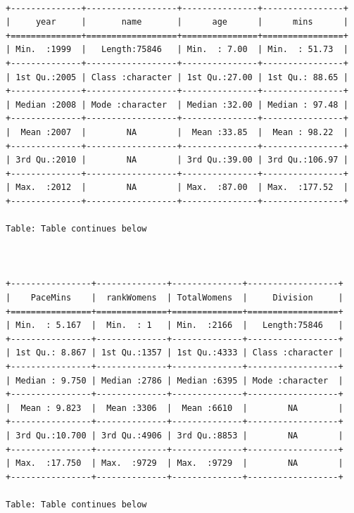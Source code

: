 \documentclass[
]{article}
\begin{document}
\begin{verbatim}

+--------------+------------------+---------------+----------------+
|     year     |       name       |      age      |      mins      |
+==============+==================+===============+================+
| Min.  :1999  |   Length:75846   | Min.  : 7.00  | Min.  : 51.73  |
+--------------+------------------+---------------+----------------+
| 1st Qu.:2005 | Class :character | 1st Qu.:27.00 | 1st Qu.: 88.65 |
+--------------+------------------+---------------+----------------+
| Median :2008 | Mode :character  | Median :32.00 | Median : 97.48 |
+--------------+------------------+---------------+----------------+
|  Mean :2007  |        NA        |  Mean :33.85  |  Mean : 98.22  |
+--------------+------------------+---------------+----------------+
| 3rd Qu.:2010 |        NA        | 3rd Qu.:39.00 | 3rd Qu.:106.97 |
+--------------+------------------+---------------+----------------+
| Max.  :2012  |        NA        | Max.  :87.00  | Max.  :177.52  |
+--------------+------------------+---------------+----------------+

Table: Table continues below

 

+----------------+--------------+--------------+------------------+
|    PaceMins    |  rankWomens  | TotalWomens  |     Division     |
+================+==============+==============+==================+
| Min.  : 5.167  |  Min.  : 1   | Min.  :2166  |   Length:75846   |
+----------------+--------------+--------------+------------------+
| 1st Qu.: 8.867 | 1st Qu.:1357 | 1st Qu.:4333 | Class :character |
+----------------+--------------+--------------+------------------+
| Median : 9.750 | Median :2786 | Median :6395 | Mode :character  |
+----------------+--------------+--------------+------------------+
|  Mean : 9.823  |  Mean :3306  |  Mean :6610  |        NA        |
+----------------+--------------+--------------+------------------+
| 3rd Qu.:10.700 | 3rd Qu.:4906 | 3rd Qu.:8853 |        NA        |
+----------------+--------------+--------------+------------------+
| Max.  :17.750  | Max.  :9729  | Max.  :9729  |        NA        |
+----------------+--------------+--------------+------------------+

Table: Table continues below

 


\end{verbatim}
\end{document}
